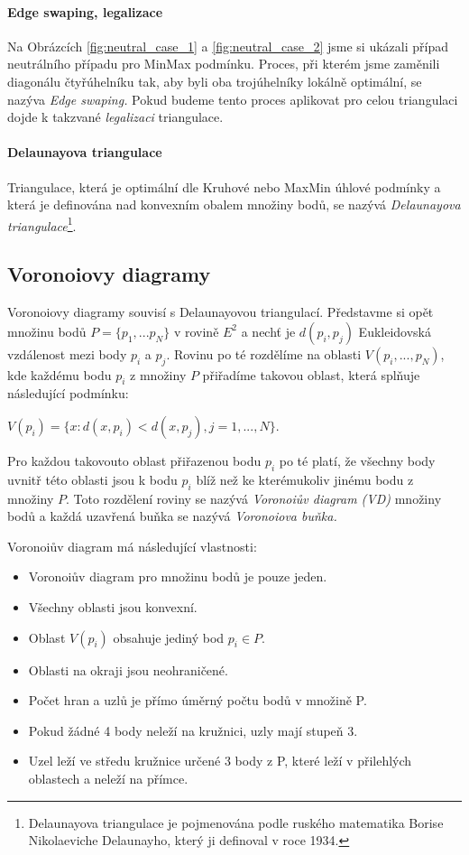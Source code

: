 \documentclass[12pt,a4paper]{article}
\begin{document}
\paragraph{Edge swaping, legalizace}
Na Obrázcích \ref{fig:neutral_case_1} a \ref{fig:neutral_case_2} jsme si ukázali případ neutrálního případu pro MinMax podmínku. Proces, při kterém jsme zaměnili diagonálu čtyřúhelníku tak, aby byli oba trojúhelníky lokálně optimální, se nazýva \emph{Edge swaping.} Pokud budeme tento proces aplikovat pro celou triangulaci dojde k takzvané \emph{legalizaci} triangulace.

\paragraph{Delaunayova triangulace}
Triangulace, která je optimální dle Kruhové nebo MaxMin úhlové podmínky a která je definována nad konvexním obalem množiny bodů, se nazývá \emph{Delaunayova triangulace}\footnote{Delaunayova triangulace je pojmenována podle ruského matematika Borise Nikolaeviche Delaunayho\cite{Delaunay}, který ji definoval v roce 1934.}.

\newpage
\subsection{Voronoiovy diagramy}

Voronoiovy diagramy souvisí s Delaunayovou triangulací. Představme si opět množinu bodů $P = \{p_1,...p_N\} $ v rovině $E^2$ a nechť je $d(p_i,p_j) $ Eukleidovská vzdálenost mezi body $p_i$ a $p_j$. Rovinu po té rozdělíme na oblasti $V(p_i,...,p_N)$, kde každému bodu $p_i$ z množiny $P$ přiřadíme takovou oblast, která splňuje následující podmínku: 

$V(p_i) = \{ x: d(x, p_i) < d(x, p_j), j = 1,...,N\}$.

Pro každou takovouto oblast přiřazenou bodu $p_i$ po té platí, že všechny body uvnitř této oblasti jsou k bodu $p_i$ blíž než ke kterémukoliv jinému bodu z množiny $P$. Toto rozdělení roviny se nazývá \emph{Voronoiův diagram (VD)} množiny bodů a každá uzavřená buňka se nazývá \emph{Voronoiova buňka.}

\bigskip
Voronoiův diagram má následující vlastnosti: 
\begin{itemize}
\item Voronoiův diagram pro množinu bodů je pouze jeden.
\item Všechny oblasti jsou konvexní.
\item Oblast $V(p_i)$ obsahuje jediný bod $p_i \in P$.
\item Oblasti na okraji jsou neohraničené.
\item Počet hran a uzlů je přímo úměrný počtu bodů v množině P.
\item Pokud žádné 4 body neleží na kružnici, uzly mají stupeň 3.
\item Uzel leží ve středu kružnice určené 3 body z P, které leží v přilehlých oblastech a neleží na přímce.
\end{itemize}
\end{document}
